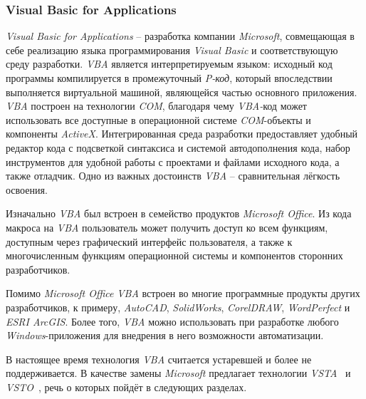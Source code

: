 \subsubsection{Visual Basic for Applications}

{\it Visual Basic for Applications} -- разработка компании {\it Microsoft}, совмещающая в себе реализацию языка программирования {\it Visual Basic} и соответствующую среду разработки. {\it VBA} является интерпретируемым языком: исходный код программы компилируется в промежуточный {\it P-код}, который впоследствии выполняется виртуальной машиной, являющейся частью основного приложения. {\it VBA} построен на технологии {\it COM}, благодаря чему {\it VBA-}код может использовать все доступные в операционной системе {\it COM}-объекты и компоненты {\it ActiveX}. Интегрированная среда разработки предоставляет удобный редактор кода с подсветкой синтаксиса и системой автодополнения кода, набор инструментов для удобной работы с проектами и файлами исходного кода, а также отладчик. Одно из важных достоинств {\it VBA} -- сравнительная лёгкость освоения.

Изначально {\it VBA} был встроен в семейство продуктов {\it Microsoft Office}. Из кода макроса на {\it VBA} пользователь может получить доступ ко всем функциям, доступным через графический интерфейс пользователя, а также к многочисленным функциям операционной системы и компонентов сторонних разработчиков.

Помимо {\it Microsoft Office} {\it VBA} встроен во многие программные продукты других разработчиков, к примеру,  {\it AutoCAD}, {\it SolidWorks}, {\it CorelDRAW}, {\it WordPerfect} и {\it ESRI ArcGIS}. Более того, {\it VBA} можно использовать при разработке любого {\it Windows}-приложения для внедрения в него возможности автоматизации. 

В настоящее время технология {\it VBA} считается устаревшей и более не поддерживается. В качестве замены {\it Microsoft} предлагает технологии {\it VSTA}~\cite{vsta-website} и {\it VSTO}~\cite{vsto-website}, речь о которых пойдёт в следующих разделах.